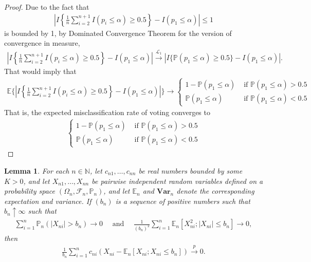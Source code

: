 \documentclass[11pt]{article}
\def\mc#1{\mathcal{#1}} %
\def\E{\mathbb{E}} %
\def\mc#1{\mathcal{#1}}
\def\var#1{\mathrm{Var}(#1)} %
\def\P{\mathbb{P}}
\def\var{\mathbf{Var}}
\def\naturals{\mathbb{N}}
\def\cp{\overset{p}{\to}}
\newtheorem{lem}{Lemma}
\theoremstyle{definition}
\begin{document}
\begin{proof}
Due to the fact that
\begin{align*}
 \left|I\left\{\frac{1}{n}\sum_{i=2}^{n+1}I(p_i \leq  \alpha) \geq 0.5\right\}
  - I( p_1 \leq  \alpha) \right| \leq 1
\end{align*}
is bounded by 1, by Dominated Convergence Theorem for the version of convergence in measure,
\begin{align*}
 \left|I\left\{\frac{1}{n}\sum_{i=2}^{n+1}I(p_i \leq  \alpha) \geq 0.5\right\}
  - I( p_1 \leq  \alpha) \right|
  \stackrel{\mathcal{L}_1}{\rightarrow}  |I\{ \P(p_1 \leq  \alpha) \geq 0.5\}
  - I( p_1 \leq  \alpha) |.
\end{align*}
That would imply that 
\begin{align*}
  \E \bigg\{\left|I\left\{\frac{1}{n}\sum_{i=2}^{n+1}I(p_i \leq  \alpha) \geq 0.5\right\}
  - I( p_1 \leq  \alpha) \right|\bigg\}
  \to  \begin{cases}
    1- \P(p_1 \leq \alpha) & \text{ if } \P(p_1 \leq \alpha) > 0.5 \\
    \P(p_1 \leq \alpha) & \text{ if } \P(p_1 \leq \alpha) < 0.5 
  \end{cases}
\end{align*}
That is, the expected misclassification rate of voting converges to 
\begin{align*}
  \begin{cases}
    1- \P(p_1 \leq \alpha) & \text{ if } \P(p_1 \leq \alpha) > 0.5 \\
    \P(p_1 \leq \alpha) & \text{ if } \P(p_1 \leq \alpha) < 0.5 
  \end{cases}
\end{align*}
\end{proof}

\begin{lem}
  \label{gwlln}  For each $n\in \naturals$, let $c_{n1}, \ldots, c_{nn}$ be real numbers bounded by some $K > 0$, and let $X_{n1}, \ldots, X_{nn}$ be pairwise independent random variables defined on a probability space $(\Omega_n, \mc{F}_n, \P_n)$, and let $\E_n$ and $\var_n$ denote the corresponding expectation and variance. If $(b_n)$ is a sequence of positive numbers such that $b_n \uparrow \infty$ such that
    \begin{align*}
      \sum_{i=1}^n \P_n (|X_{ni}| > b_n) \to 0
      \quad \text{ and } 
      \quad \frac{1}{(b_n)^2} \sum_{i=1}^n \E_n[X_{ni}^2; |X_{ni}|\leq b_n] \to 0,
    \end{align*}
    then
    \begin{align*}
      \frac{1}{b_n} \sum_{i=1}^n c_{ni} (X_{ni} - \E_n[X_{ni}; X_{ni} \leq b_n]) \cp 0.
    \end{align*}
\end{lem}
\end{document}

